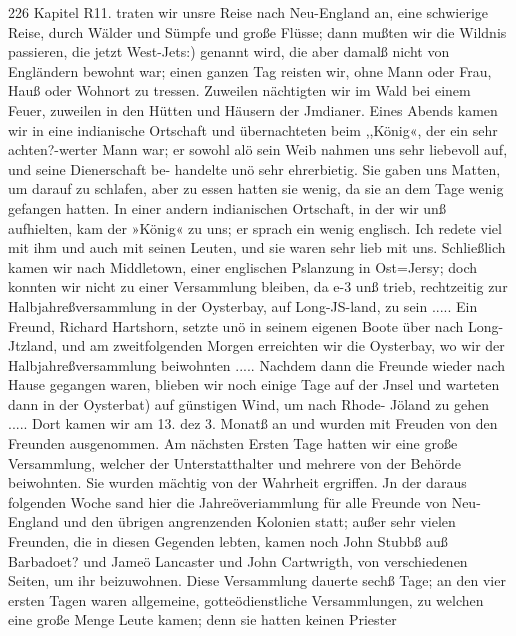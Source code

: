 226 Kapitel R11.
traten wir unsre Reise nach Neu-England an, eine schwierige
Reise, durch Wälder und Sümpfe und große Flüsse; dann mußten
wir die Wildnis passieren, die jetzt West-Jets:) genannt wird,
die aber damalß nicht von Engländern bewohnt war; einen ganzen
Tag reisten wir, ohne Mann oder Frau, Hauß oder Wohnort
zu tressen. Zuweilen nächtigten wir im Wald bei einem Feuer,
zuweilen in den Hütten und Häusern der Jmdianer. Eines Abends
kamen wir in eine indianische Ortschaft und übernachteten beim
,,König«, der ein sehr achten?-werter Mann war; er sowohl alö sein
Weib nahmen uns sehr liebevoll auf, und seine Dienerschaft be-
handelte unö sehr ehrerbietig. Sie gaben uns Matten, um darauf
zu schlafen, aber zu essen hatten sie wenig, da sie an dem Tage
wenig gefangen hatten. In einer andern indianischen Ortschaft, in
der wir unß aufhielten, kam der »König« zu uns; er sprach ein
wenig englisch. Ich redete viel mit ihm und auch mit seinen
Leuten, und sie waren sehr lieb mit uns. Schließlich kamen
wir nach Middletown, einer englischen Pslanzung in Ost=Jersy;
doch konnten wir nicht zu einer Versammlung bleiben, da e-3 unß
trieb, rechtzeitig zur Halbjahreßversammlung in der Oysterbay,
auf Long-JS-land, zu sein ..... Ein Freund, Richard Hartshorn,
setzte unö in seinem eigenen Boote über nach Long-Jtzland, und
am zweitfolgenden Morgen erreichten wir die Oysterbay, wo wir der
Halbjahreßversammlung beiwohnten ..... Nachdem dann die
Freunde wieder nach Hause gegangen waren, blieben wir noch
einige Tage auf der Jnsel und warteten dann in der Oysterbat)
auf günstigen Wind, um nach Rhode- Jöland zu gehen .....
Dort kamen wir am 13. dez 3. Monatß an und wurden mit
Freuden von den Freunden ausgenommen. Am nächsten
Ersten Tage hatten wir eine große Versammlung, welcher der
Unterstatthalter und mehrere von der Behörde beiwohnten. Sie
wurden mächtig von der Wahrheit ergriffen. Jn der daraus
folgenden Woche sand hier die Jahreöveriammlung für alle Freunde
von Neu-England und den übrigen angrenzenden Kolonien statt;
außer sehr vielen Freunden, die in diesen Gegenden lebten, kamen
noch John Stubbß auß Barbadoet? und Jameö Lancaster und
John Cartwrigth, von verschiedenen Seiten, um ihr beizuwohnen.
Diese Versammlung dauerte sechß Tage; an den vier ersten Tagen
waren allgemeine, gotteödienstliche Versammlungen, zu welchen
eine große Menge Leute kamen; denn sie hatten keinen Priester


